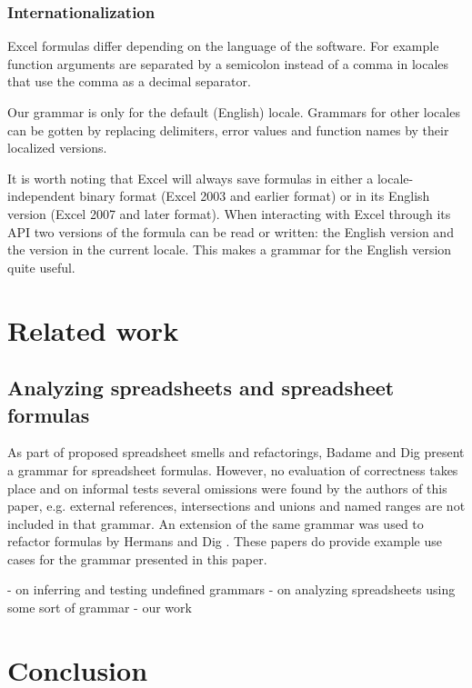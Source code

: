 \documentclass[conference]{IEEEtran}
\begin{document}
\subsubsection{Internationalization}

Excel formulas differ depending on the language of the software. For example function arguments are separated by a semicolon instead of a comma in locales that use the comma as a decimal separator.

Our grammar is only for the default (English) locale. Grammars for other locales can be gotten by replacing delimiters, error values and function names by their localized versions.

It is worth noting that Excel will always save formulas in either a locale-independent binary format (Excel 2003 and earlier format) or in its English version (Excel 2007 and later format). When interacting with Excel through its API two versions of the formula can be read or written: the English version and the version in the current locale.
This makes a grammar for the English version quite useful.

\section{Related work}
\label{section:relatedWork}

\subsection{Analyzing spreadsheets and spreadsheet formulas}

As part of proposed spreadsheet smells and refactorings, Badame and Dig \cite{badame2012refactoring} present a grammar for spreadsheet formulas.
However, no evaluation of correctness takes place and on informal tests several omissions were found by the authors of this paper, e.g. external references, intersections and unions and named ranges are not included in that grammar.
An extension of the same grammar was used to refactor formulas by Hermans and Dig \cite{hermans2014bumblebee}.
These papers do provide example use cases for the grammar presented in this paper.

- on inferring and testing undefined grammars
- on analyzing spreadsheets using some sort of grammar
- our work

\section{Conclusion}
\label{section:conclusion}
\end{document}
